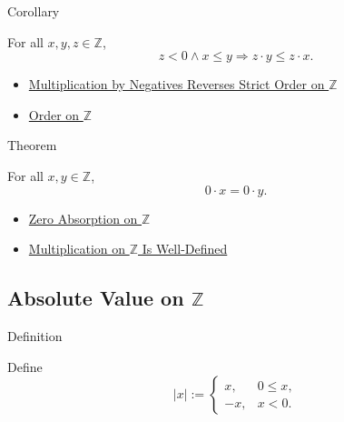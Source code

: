 \begin{corollarybox}{Corollary}
\begin{corollary}
\label{cor:negative-multiplication-reverses-order-on-z}
For all $x,y,z\in\mathbb{Z}$,
\[
z<0\land x\le y \Longrightarrow z\cdot y\le z\cdot x.
\]
\end{corollary}
\end{corollarybox}

\begin{dependencies}
\begin{itemize}
  \item \hyperref[thm:negative-multiplication-reverses-strict-order-on-z]{Multiplication by Negatives Reverses Strict Order on $\mathbb{Z}$}
  \item \hyperref[def:order-on-z]{Order on $\mathbb{Z}$}
\end{itemize}
\end{dependencies}

\begin{theorembox}{Theorem}
\begin{theorem}
\label{thm:zero-multiplication-collapses-order-on-z}
For all $x,y\in\mathbb{Z}$,
\[
0\cdot x=0\cdot y.
\]
\end{theorem}
\end{theorembox}

\begin{dependencies}
\begin{itemize}
  \item \hyperref[cor:zero-absorption-on-z]{Zero Absorption on $\mathbb{Z}$}
  \item \hyperref[thm:multiplication-on-z-well-defined]{Multiplication on $\mathbb{Z}$ Is Well-Defined}
\end{itemize}
\end{dependencies}

\subsection*{\texorpdfstring{Absolute Value on $\mathbb{Z}$}{Absolute Value on Z}}

\begin{definitionbox}{Definition}
\begin{definition}
\label{def:absolute-value-on-z}
Define
\[
|x|:=\begin{cases}
x, & 0\le x,\\
-x, & x<0.
\end{cases}
\]
\end{definition}
\end{definitionbox}

